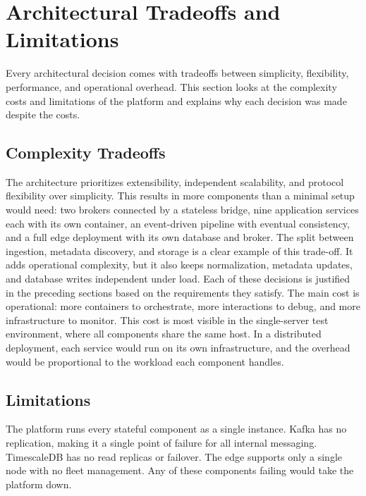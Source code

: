 
\section{Architectural Tradeoffs and Limitations}
\label{sec:ProposedModelArchitecturalTradeoffsAndLimitations}

Every architectural decision comes with tradeoffs between simplicity, flexibility, performance, and operational overhead. This section looks at the complexity costs and limitations of the platform and explains why each decision was made despite the costs.

\subsection{Complexity Tradeoffs}
The architecture prioritizes extensibility, independent scalability, and protocol flexibility over simplicity. This results in more components than a minimal setup would need: two brokers connected by a stateless bridge, nine application services each with its own container, an event-driven pipeline with eventual consistency, and a full edge deployment with its own database and broker. The split between ingestion, metadata discovery, and storage is a clear example of this trade-off. It adds operational complexity, but it also keeps normalization, metadata updates, and database writes independent under load. Each of these decisions is justified in the preceding sections based on the requirements they satisfy. The main cost is operational: more containers to orchestrate, more interactions to debug, and more infrastructure to monitor. This cost is most visible in the single-server test environment, where all components share the same host. In a distributed deployment, each service would run on its own infrastructure, and the overhead would be proportional to the workload each component handles.

\subsection{Limitations}
The platform runs every stateful component as a single instance. Kafka has no replication, making it a single point of failure for all internal messaging. TimescaleDB has no read replicas or failover. The edge supports only a single node with no fleet management. Any of these components failing would take the platform down.

